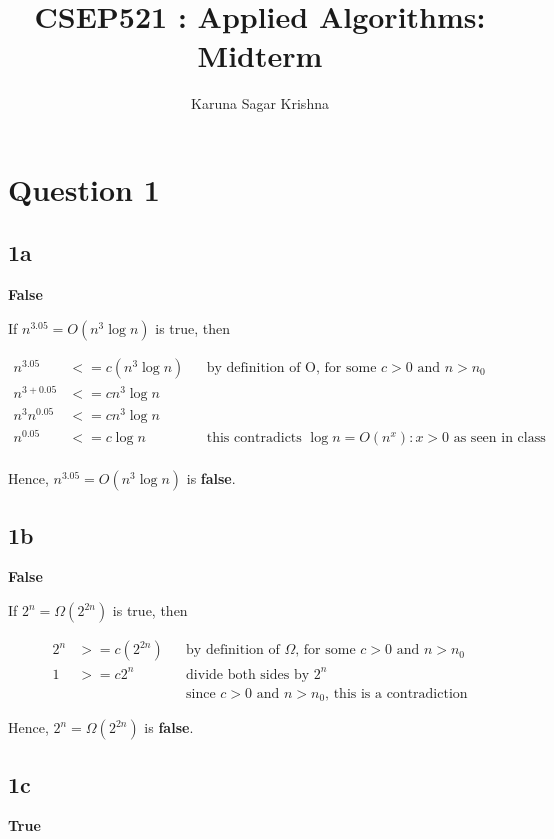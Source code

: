\documentclass{article}
\title{CSEP521 : Applied Algorithms: Midterm}
\author{Karuna Sagar Krishna}
\begin{document}
    \maketitle

    \section*{Question 1}

    \subsection*{1a}
    \textbf{False}

    If $n^{3.05} = O(n^3 \log n)$ is true, then
    
    \begin{align*}
        n^{3.05} & <= c(n^3 \log n) && \text{by definition of O, for some $c > 0$ and $n > n_0$} \\
        n^{3+0.05} & <= c n^3 \log n \\
        n^3 n^{0.05} & <= c n^3 \log n \\
        n^{0.05} & <= c \log n && \text{this contradicts $\log n = O(n^x) : x > 0$ as seen in class} \\
    \end{align*}

    Hence, $n^{3.05} = O(n^3 \log n)$ is \textbf{false}.

    \subsection*{1b}
    \textbf{False}
    
    If $2^n = \Omega(2^{2n})$ is true, then
    
    \begin{align*}
        2^n & >= c(2^{2n}) && \text{by definition of $\Omega$, for some $c > 0$ and $n > n_0$} \\
        1 & >= c2^n && \text{divide both sides by $2^n$} \\
          &         && \text{since $c > 0$ and $n > n_0$, this is a contradiction}
    \end{align*}

    Hence, $2^n = \Omega(2^{2n})$ is \textbf{false}.

    \subsection*{1c}
    \textbf{True}
    
\end{document}
